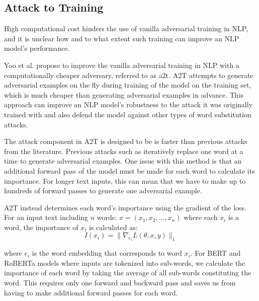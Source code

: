 \subsection{Attack to Training}\label{subsec:a2t}
High computational cost hinders the use of vanilla adversarial training in NLP, and it is unclear how and to what extent such training can improve an NLP model's performance.

Yoo et al. \cite{https://doi.org/10.48550/arxiv.2109.00544} propose to improve the vanilla
adversarial training in NLP with a computationally cheaper adversary, referred to as \acrfull{a2t}. 
A2T attempts to generate adversarial examples on the fly during training of the model on the training set, which is much cheaper than generating adversarial examples in advance.
This approach can improve an NLP model's robustness to the attack it was originally trained with and also defend the model against other types of word substitution attacks.

The attack component in A2T is designed to be is faster than previous attacks from the literature. Previous attacks such as \cite{conf/emnlp/GargR20, journals/corr/abs-1907-11932} iteratively replace one word at a time to generate adversarial examples.
One issue with this method is that an additional
forward pass of the model must be made for each
word to calculate its importance. For longer text inputs, this can mean that we have to make up to hundreds of forward passes to generate one adversarial example.

A2T instead determines each word's importance
using the gradient of the loss. For an input text including $n$ words: $x = (x_1, x_2, . . . , x_n)$ where each $x_i$ is a word, the importance of $x_i$ is calculated as:
\begin{equation}
    I(x_i) = \| \nabla_{e_i} L(\theta, x, y) \|_1
\end{equation}

where $e_i$ is the word embedding that corresponds to word $x_i$. For BERT and RoBERTa models where inputs are tokenized into sub-words, we calculate the importance of each word by taking the average of all sub-words constituting the word. This requires only one forward and backward
pass and saves us from having to make additional forward passes for each word.
